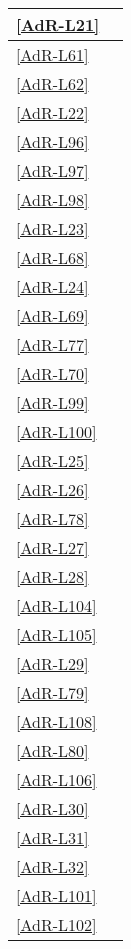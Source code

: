 \begin{longtable}{|P{6cm}|P{6cm}|}
	\hline \ref{AdR-L21} &  \\ %
	\hline \ref{AdR-L61} &  \\
	\hline \ref{AdR-L62} &  \\
	\hline \ref{AdR-L22} &  \\
	\hline \ref{AdR-L96} &  \\
	\hline \ref{AdR-L97} &  \\ %
	\hline \ref{AdR-L98} &  \\
	\hline \ref{AdR-L23} &  \\
	\hline \ref{AdR-L68} &  \\
	\hline \ref{AdR-L24} &  \\
	\hline \ref{AdR-L69} &  \\ %
	\hline \ref{AdR-L77} &  \\
	\hline \ref{AdR-L70} &  \\
	\hline \ref{AdR-L99} &  \\
	\hline \ref{AdR-L100} &  \\
	\hline \ref{AdR-L25} &  \\ %
	\hline \ref{AdR-L26} &  \\
	\hline \ref{AdR-L78} &  \\
	\hline \ref{AdR-L27} &  \\
	\hline \ref{AdR-L28} &  \\
	\hline \ref{AdR-L104} &  \\ %
	\hline \ref{AdR-L105} &  \\
	\hline \ref{AdR-L29} &  \\
	\hline \ref{AdR-L79} &  \\
	\hline \ref{AdR-L108} &  \\
	\hline \ref{AdR-L80} &  \\ %
	\hline \ref{AdR-L106} &  \\
	\hline \ref{AdR-L30} &  \\
	\hline \ref{AdR-L31} &  \\
	\hline \ref{AdR-L32} &  \\
	\hline \ref{AdR-L101} &  \\ %
	\hline \ref{AdR-L102} &  \\

\end{longtable}
